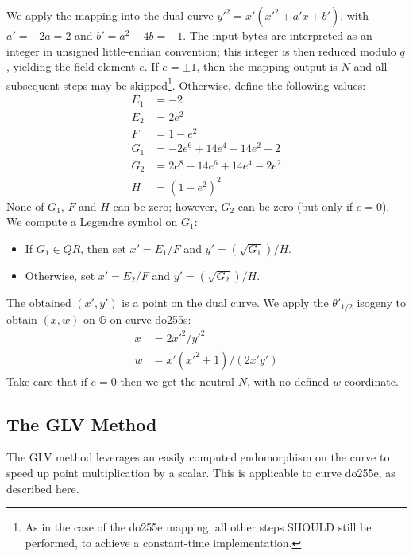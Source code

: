 \documentclass{llncs}
\newcommand{\bG}{\mathbb{G}}
\begin{document}
We apply the mapping into the dual curve $y'^2 = x'(x'^2 + a' x + b')$,
with $a' = -2a = 2$ and $b' = a^2-4b = -1$. The input bytes are
interpreted as an integer in unsigned little-endian convention; this
integer is then reduced modulo $q$, yielding the field element $e$. If
$e = \pm 1$, then the mapping output is $N$ and all subsequent steps may be
skipped\footnote{As in the case of the do255e mapping, all other steps
SHOULD still be performed, to achieve a constant-time implementation.}.
Otherwise, define the following values:
\begin{align*}
    E_1 &= -2 \\
    E_2 & = 2e^2 \\
    F &= 1 - e^2 \\
    G_1 &= -2 e^6 + 14 e^4 - 14 e^2 + 2 \\
    G_2 &=  2 e^8 - 14 e^6 + 14 e^4 - 2 e^2 \\
    H &= (1 - e^2)^2
\end{align*}
None of $G_1$, $F$ and $H$ can be zero; however, $G_2$ can be zero (but only
if $e = 0$). We compute a Legendre symbol on $G_1$:
\begin{itemize}
    \item If $G_1 \in QR$, then set $x' = E_1 / F$ and $y' = (\sqrt{G_1}) / H$.
    \item Otherwise, set $x' = E_2 / F$ and
    $y' = (\sqrt{G_2}) / H$.
\end{itemize}

The obtained $(x', y')$ is a point on the dual curve. We apply the
$\theta'_{1/2}$ isogeny to obtain $(x, w)$ on $\bG$ on curve do255s:
\begin{align*}
    x &= 2 x'^2 / y'^2 \\
    w &= x'(x'^2 + 1) / (2 x' y')
\end{align*}
Take care that if $e = 0$ then we get the neutral $N$, with no defined
$w$ coordinate.

\subsection{The GLV Method}\label{sec:implementations:glv}

The GLV method\cite{GalLamVan2001} leverages an easily computed endomorphism
on the curve to speed up point multiplication by a scalar. This is
applicable to curve do255e, as described here.
\end{document}
